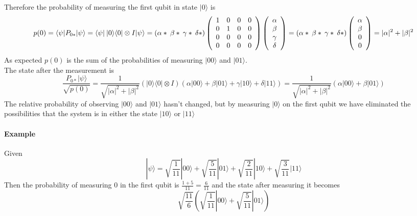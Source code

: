 \documentclass[10pt]{report}
\begin{document}
Therefore the probability of measuring the first qubit in state $|0\rangle$ is $$p(0) = \langle\psi|P_{0*}|\psi\rangle = \langle\psi|\:|0\rangle\langle0|\otimes I|\psi\rangle = (\alpha*\:\beta*\:\gamma*\:\delta*)\left(\begin{array}{c c c c}
1&0&0&0\\
0&1&0&0\\
0&0&0&0\\
0&0&0&0
\end{array}\right)\left(\begin{array}{c}
\alpha\\\beta\\\gamma\\\delta
\end{array}\right) =(\alpha*\:\beta*\:\gamma*\:\delta*)\left(\begin{array}{c}
\alpha\\\beta\\0\\0
\end{array}\right) = |\alpha|^2+|\beta|^2$$
As expected $p(0)$ is the sum of the probabilities of measuring $|00\rangle$ and $|01\rangle$.\\
The state after the measurement is 
$$\frac{P_{0*}|\psi\rangle}{\sqrt{p(0)}} = \frac{1}{\sqrt{|\alpha|^2+|\beta|^2}} (|0\rangle\langle0|\otimes I)(\alpha|00\rangle + \beta|01\rangle + \gamma|10\rangle + \delta|11\rangle) = \frac{1}{\sqrt{|\alpha|^2+|\beta|^2}}(\alpha|00\rangle+\beta|01\rangle)$$
The relative probability of observing $|00\rangle$ and $|01\rangle$ hasn't changed, but by measuring $|0\rangle$ on the first qubit we have eliminated the possibilities that the system is in either the state $|10\rangle$ or $|11\rangle$
\paragraph{Example} Given $$|\psi\rangle=\sqrt{\frac{1}{11}}|00\rangle+\sqrt{\frac{5}{11}}|01\rangle+\sqrt{\frac{2}{11}}|10\rangle+\sqrt{\frac{3}{11}}|11\rangle$$
Then the probability of measuring $0$ in the first qubit is $\frac{1 + 5}{11} = \frac{6}{11}$ and the state after measuring it becomes
$$\sqrt{\frac{11}{6}}\left(\sqrt{\frac{1}{11}}|00\rangle+\sqrt{\frac{5}{11}}|01\rangle\right)$$
\end{document}
